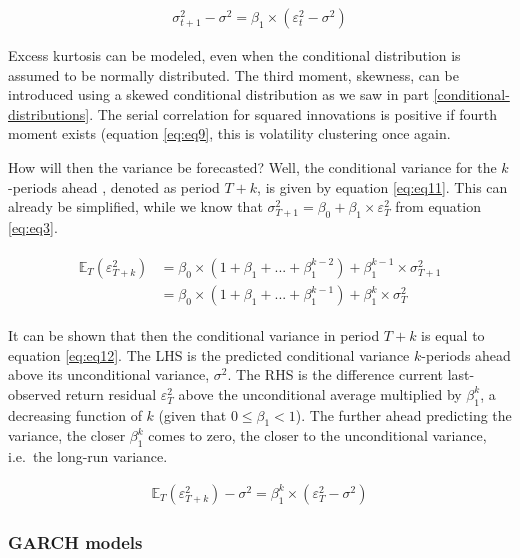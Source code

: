\documentclass[a4paper, twoside]{templates/ociamthesis}
\begin{document}
\begin{align} 
\sigma_{t+1}^2 - \sigma^2 = \beta_1\times(\varepsilon_t^2 - \sigma^2)
 \label{eq:eq10}
\end{align}

\noindent Excess kurtosis can be modeled, even when the conditional distribution is assumed to be normally distributed. The third moment, skewness, can be introduced using a skewed conditional distribution as we saw in part \ref{conditional-distributions}. The serial correlation for squared innovations is positive if fourth moment exists (equation \eqref{eq:eq9}, this is volatility clustering once again.

\noindent How will then the variance be forecasted? Well, the conditional variance for the \(k\)-periods ahead , denoted as period \(T+k\), is given by equation \eqref{eq:eq11}. This can already be simplified, while we know that \(\sigma_{T+1}^2 = \beta_0 + \beta_1 \times \varepsilon_T^2\) from equation \eqref{eq:eq3}.

\begin{align} 
\begin{split}
\mathbb{E}_T(\varepsilon_{T+k}^2) 
&= \beta_0\times(1+\beta_1 + ... + \beta_1^{k-2}) + \beta_1^{k-1}\times\sigma_{T+1}^2 \\
&= \beta_0\times(1+\beta_1 + ... + \beta_1^{k-1}) + \beta_1^{k}\times\sigma_{T}^2
\end{split}
 \label{eq:eq11}
\end{align}

\noindent It can be shown that then the conditional variance in period \(T+k\) is equal to equation \eqref{eq:eq12}. The LHS is the predicted conditional variance \(k\)-periods ahead above its unconditional variance, \(\sigma^2\). The RHS is the difference current last-observed return residual \(\varepsilon_T^2\) above the unconditional average multiplied by \(\beta_1^k\), a decreasing function of \(k\) (given that \(0 \le\beta_1 <1\)). The further ahead predicting the variance, the closer \(\beta_1^k\) comes to zero, the closer to the unconditional variance, i.e.~the long-run variance.

\begin{align} 
\mathbb{E}_T(\varepsilon_{T+k}^2) - \sigma^2 = \beta_1^k\times(\varepsilon_T^2 - \sigma^2)
 \label{eq:eq12}
\end{align}

\hypertarget{garch-models}{%
\subsubsection{GARCH models}\label{garch-models}}
\end{document}
